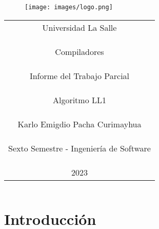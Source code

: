 \documentclass[https://www.overleaf.com/project/63761df255a8a9f4a15c3579
	letterpaper, %
	10pt, %
]{CSUniSchoolLabReport}
\begin{document}
    
    \begin{figure}[H] %
    	\centering %
    	\texttt{[image: images/logo.png]} %
    \end{figure}
    
    \begin{center}
        \begin{tabular} {c}
            \Huge Universidad La Salle \\\\\\\\
            \huge Compiladores \\\\\\\\
            \LARGE Informe del Trabajo Parcial \\\\\\\\
            \huge Algoritmo LL1 \\\\\\\\
            \LARGE Karlo Emigdio Pacha Curimayhua \\\\\\\\
            \LARGE Sexto Semestre - Ingeniería de Software \\\\\\\\
            \LARGE 2023
          \end{tabular}
    \end{center}
    
    \begin{center}
    	\begin{tabular}{l r}
    	\end{tabular}
    \end{center}
    
    
    \section{Introducción }
    
\end{document}

